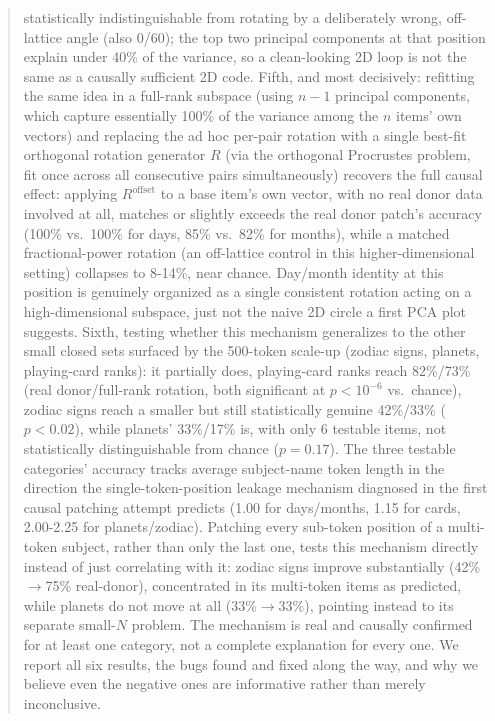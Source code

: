 \documentclass[11pt]{article}
\begin{document}
\begin{abstract}
statistically indistinguishable from rotating by a deliberately wrong,
off-lattice angle (also 0/60); the top two principal components at that
position explain under 40\% of the variance, so a clean-looking 2D loop is
not the same as a causally sufficient 2D code. Fifth, and most decisively:
refitting the same idea in a full-rank subspace (using $n{-}1$ principal
components, which capture essentially 100\% of the variance among the $n$
items' own vectors) and replacing the ad hoc per-pair rotation with a single
best-fit orthogonal rotation generator $R$ (via the orthogonal Procrustes
problem, fit once across all consecutive pairs simultaneously) recovers the
full causal effect: applying $R^{\text{offset}}$ to a base item's own vector,
with no real donor data involved at all, matches or slightly exceeds the real
donor patch's accuracy (100\% vs.\ 100\% for days, 85\% vs.\ 82\% for months),
while a matched fractional-power rotation (an off-lattice control in this
higher-dimensional setting) collapses to 8-14\%, near chance. Day/month
identity at this position is genuinely organized as a single consistent
rotation acting on a high-dimensional subspace, just not the naive 2D
circle a first PCA plot suggests. Sixth, testing whether this mechanism
generalizes to the other small closed sets surfaced by the 500-token
scale-up (zodiac signs, planets, playing-card ranks): it partially does,
playing-card ranks reach 82\%/73\% (real donor/full-rank rotation, both
significant at $p < 10^{-6}$ vs.\ chance), zodiac signs reach a smaller but
still statistically genuine 42\%/33\% ($p < 0.02$), while planets' 33\%/17\%
is, with only 6 testable items, not statistically distinguishable from
chance ($p = 0.17$). The three testable categories' accuracy tracks average
subject-name token length in the direction the single-token-position
leakage mechanism diagnosed in the first causal patching attempt predicts
(1.00 for days/months, 1.15 for cards, 2.00-2.25 for planets/zodiac).
Patching every sub-token position of a multi-token subject, rather than
only the last one, tests this mechanism directly instead of just
correlating with it: zodiac signs improve substantially (42\%$\to$75\%
real-donor), concentrated in its multi-token items as predicted, while
planets do not move at all (33\%$\to$33\%), pointing instead to its
separate small-$N$ problem. The mechanism is real and causally confirmed
for at least one category, not a complete explanation for every one. We
report all six results, the bugs found and fixed
along the way, and why we believe even the negative ones are informative
rather than merely inconclusive.
\end{abstract}
\end{document}
